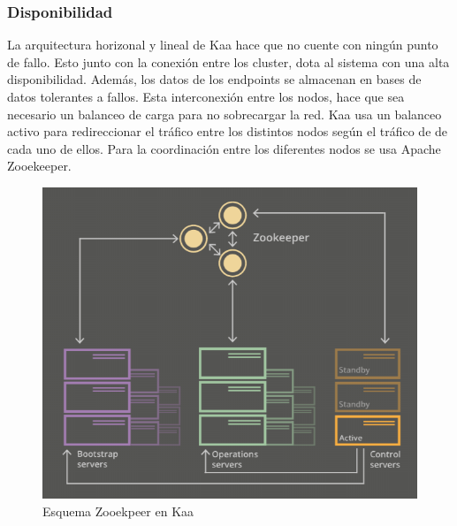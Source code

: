 \documentclass[12pt, twoside]{book}
\begin{document}
\subsubsection*{Disponibilidad}
La arquitectura horizonal y lineal de Kaa hace que no cuente con ningún punto de fallo. Esto junto con la conexión entre los cluster, dota al sistema con una alta disponibilidad.  Además, los datos de los endpoints se almacenan en bases de datos tolerantes a fallos. Esta interconexión entre los nodos, hace que sea necesario un balanceo de carga para no sobrecargar la red. Kaa usa un balanceo activo para redireccionar el tráfico entre los distintos nodos según el tráfico de de cada uno de ellos. Para la coordinación entre los diferentes nodos se usa Apache Zooekeeper.
\begin{figure}[H]
\centering
\includegraphics[scale=0.5]{images/disponibilidad_captura}
\caption{Esquema Zooekpeer en Kaa}\label{L509}
\end{figure} 
\end{document}
